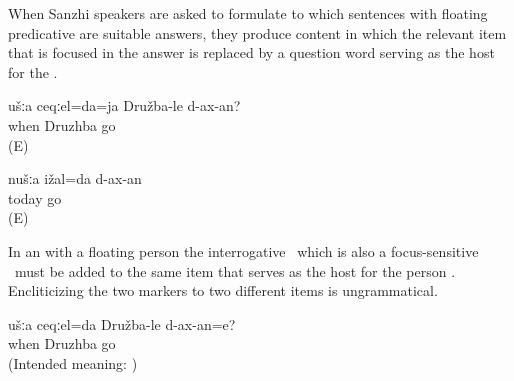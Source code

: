 When Sanzhi speakers are asked to formulate  to which sentences with floating predicative  are suitable answers, they produce content  in which the relevant item that is focused in the answer is replaced by a question word serving as the host for the  . 
%
\begin{exe}
	\ex	\label{ex:WHEN will you / do you have to go to Druzhba We will / have to go TODAY@9}
	\begin{xlist}
		\ex	\label{ex:WHEN will you / do you have to go to Druzhba@9a}
		\gll	ušːa	ceqːel=da=ja	Družba-le	d-ax-an?\\
				when	Druzhba	go\\
		\glt	{} (E)

		\ex	\label{ex:We will / have to go TODAY@9b}
		\gll	nušːa	ižal=da	d-ax-an\\
				today	go\\
		\glt	{} (E)
	\end{xlist}
\end{exe}

In an  with a floating person  the interrogative  \tnd\ which is also a focus-sensitive  \tnd\ must be added to the same item that serves as the host for the person . Encliticizing the two markers to two different items  is ungrammatical.
%
\begin{exe}
	\ex	\label{ex:WHEN will you / do you have to go to DruzhbaWRONG}
	\gll	{*}	ušːa	ceqːel=da	Družba-le	d-ax-an=e?\\
		{}		when	Druzhba	go\\
	\glt	(Intended meaning: )
\end{exe}

